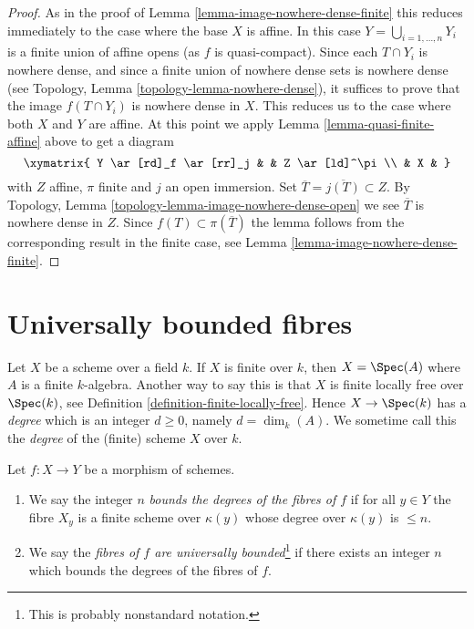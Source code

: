 \begin{proof}
As in the proof of Lemma \ref{lemma-image-nowhere-dense-finite} this
reduces immediately to the case where the base $X$ is affine.
In this case $Y = \bigcup_{i = 1, \ldots, n} Y_i$ is a finite union
of affine opens (as $f$ is quasi-compact). Since each $T \cap Y_i$
is nowhere dense, and since a finite union of nowhere dense sets is
nowhere dense (see
Topology, Lemma \ref{topology-lemma-nowhere-dense}),
it suffices to prove that the image $f(T \cap Y_i)$ is nowhere dense in $X$.
This reduces us to the case where both $X$ and $Y$ are affine. At this point
we apply Lemma \ref{lemma-quasi-finite-affine} above to get a diagram
$$
\xymatrix{
Y \ar[rd]_f \ar[rr]_j & & Z \ar[ld]^\pi \\
& X &
}
$$
with $Z$ affine, $\pi$ finite and $j$ an open immersion.
Set $\overline{T} = \overline{j(T)} \subset Z$. By
Topology, Lemma \ref{topology-lemma-image-nowhere-dense-open}
we see $\overline{T}$ is nowhere dense in $Z$.
Since $f(T) \subset \pi(\overline{T})$
the lemma follows from the corresponding result in the finite case, see
Lemma \ref{lemma-image-nowhere-dense-finite}.
\end{proof}




\section{Universally bounded fibres}
\label{section-universally-bounded}

\noindent
Let $X$ be a scheme over a field $k$. If $X$ is finite over $k$,
then $X = \Spec(A)$ where $A$ is a finite $k$-algebra. Another way
to say this is that $X$ is finite locally free over $\Spec(k)$,
see Definition \ref{definition-finite-locally-free}. Hence
$X \to \Spec(k)$ has a {\it degree} which is an integer $d \geq 0$,
namely $d = \dim_k(A)$. We sometime call this the {\it degree} of the (finite)
scheme $X$ over $k$.

\begin{definition}
\label{definition-universally-bounded}
Let $f : X \to Y$ be a morphism of schemes.
\begin{enumerate}
\item We say the integer $n$ {\it bounds the degrees of the fibres
of $f$} if for all $y \in Y$
the fibre $X_y$ is a finite scheme over $\kappa(y)$ whose
degree over $\kappa(y)$ is $\leq n$.
\item We say the {\it fibres of $f$ are universally bounded}\footnote{This is
probably nonstandard notation.}
if there exists an integer $n$ which bounds the degrees of the fibres
of $f$.
\end{enumerate}
\end{definition}

